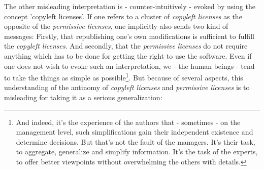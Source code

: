 The other misleading interpretation is - counter-intuitively - evoked by using
the concept 'copyleft licenses'. If one refers to a cluster of \emph{copyleft
licenses} as the opposite of the \emph{permissive licenses}, one implicitly also
sends two kind of messages: Firstly, that republishing one's own modifications
is sufficient to fulfill the \emph{copyleft licenses}. And secondly, that the
\emph{permissive licenses} do not require anything which has to be done for
getting the right to use the software. Even if one does not wish to evoke such
an interpretation, we - the human beings - tend to take the things as simple as
possible\footnote{And indeed, it's the experience of the authors that -
sometimes - on the management level, such simplifications gain their independent
existence and determine decisions. But that's not the fault of the managers.
It's their task, to aggregate, generalize and simplify information. It's the
task of the experts, to offer better viewpoints without overwhelming the others
with details.}. But because of several aspects, this understanding of the
antinomy of \emph{copyleft licenses} and \emph{permissive licenses} is to
misleading for taking it as a serious generalization:

